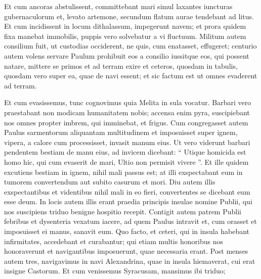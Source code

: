 \begin{biblechapter}
\begin{biblechapter}
\begin{biblechapter}
\begin{biblechapter}
\begin{biblechapter}
\begin{biblechapter}
\begin{biblechapter}
\begin{biblechapter}
\begin{biblechapter}
\begin{biblechapter}
\begin{biblechapter}
\begin{biblechapter}
\begin{biblechapter}
\begin{biblechapter}
\begin{biblechapter}
\begin{biblechapter}
\begin{biblechapter}
\begin{biblechapter}
\begin{biblechapter}
\begin{biblechapter}
\begin{biblechapter}
\begin{biblechapter}
\begin{biblechapter}
\begin{biblechapter}
\begin{biblechapter}
\begin{biblechapter}
\begin{biblechapter}
 \verse Et cum ancoras abstulissent, committebant mari simul laxantes iuncturas gubernaculorum et, levato artemone, secundum flatum aurae tendebant ad litus. 
 \verse Et cum incidissent in locum dithalassum, impegerunt navem; et prora quidem fixa manebat immobilis, puppis vero solvebatur a vi fluctuum. 
\verse Militum autem consilium fuit, ut custodias occiderent, ne quis, cum enatasset, effugeret; 
\verse centurio autem volens servare Paulum prohibuit eos a consilio iussitque eos, qui possent natare, mittere se primos et ad terram exire 
\verse et ceteros, quosdam in tabulis, quosdam vero super ea, quae de navi essent; et sic factum est ut omnes evaderent ad terram.
 
\begin{biblechapter}
\verse Et cum evasissemus, tunc cognovimus quia Melita in sula vocatur. 
\verse Barbari vero praestabant non modicam humanitatem nobis; accensa enim pyra, suscipiebant nos omnes propter imbrem, qui imminebat, et frigus. 
\verse Cum congregasset autem Paulus sarmentorum aliquantam multitudinem et imposuisset super ignem, vipera, a calore cum processisset, invasit manum eius. 
\verse Ut vero viderunt barbari pendentem bestiam de manu eius, ad invicem dicebant: “ Utique homicida est homo hic, qui cum evaserit de mari, Ultio non permisit vivere ”.
 \verse Et ille quidem excutiens bestiam in ignem, nihil mali passus est; 
\verse at illi exspectabant eum in tumorem convertendum aut subito casurum et mori. Diu autem illis exspectantibus et videntibus nihil mali in eo fieri, convertentes se dicebant eum esse deum.
 \verse In locis autem illis erant praedia principis insulae nomine Publii, qui nos suscipiens triduo benigne hospitio recepit. 
\verse Contigit autem patrem Publii febribus et dysenteria vexatum iacere, ad quem Paulus intravit et, cum orasset et imposuisset ei manus, sanavit eum. 
\verse Quo facto, et ceteri, qui in insula habebant infirmitates, accedebant et curabantur; 
\verse qui etiam multis honoribus nos honoraverunt et navigantibus imposuerunt, quae necessaria erant.
 \verse Post menses autem tres, navigavimus in navi Alexandrina, quae in insula hiemaverat, cui erat insigne Castorum. 
\verse Et cum venissemus Syracusam, mansimus ibi triduo; 

\end{biblechapter}
\end{biblechapter}
\end{biblechapter}
\end{biblechapter}
\end{biblechapter}
\end{biblechapter}
\end{biblechapter}
\end{biblechapter}
\end{biblechapter}
\end{biblechapter}
\end{biblechapter}
\end{biblechapter}
\end{biblechapter}
\end{biblechapter}
\end{biblechapter}
\end{biblechapter}
\end{biblechapter}
\end{biblechapter}
\end{biblechapter}
\end{biblechapter}
\end{biblechapter}
\end{biblechapter}
\end{biblechapter}
\end{biblechapter}
\end{biblechapter}
\end{biblechapter}
\end{biblechapter}
\end{biblechapter}
